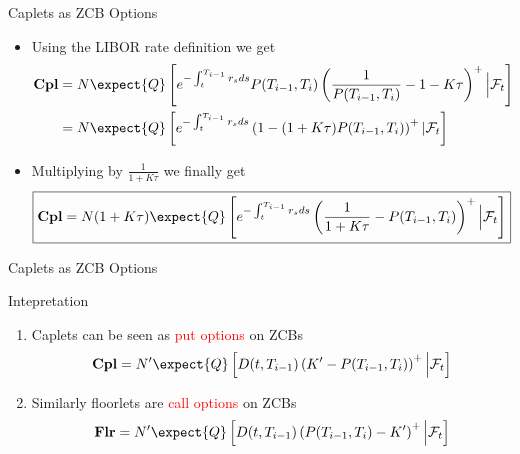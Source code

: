 \documentclass{beamer}
\begin{document}
\begin{frame}{Caplets as ZCB Options}
	\begin{itemize}
		\item<1-> Using the LIBOR rate definition we get
		\begin{equation*}
			\begin{aligned}
				\textbf{Cpl} &=N\expect{Q}\left[e^{-\int_t^{T_{i-1}}r_s ds}P(T_{i-1},T_i)\left(\frac{1}{P(T_{i-1},T_i)}-1-K\tau\right)^+ \Big\rvert \mathcal{F}_t\right] \\
				& = N\expect{Q}\left[e^{-\int_t^{T_{i-1}}r_s ds}\left(1-(1+K\tau)P(T_{i-1},T_i)\right)^+ | \mathcal{F}_t\right]
			\end{aligned}
		\end{equation*}
		\item<2-> Multiplying by $\frac{1}{1+K\tau}$ we finally get
		\begin{equation}
			\boxed{\textbf{Cpl}=N(1+K\tau)\expect{Q}\left[e^{-\int_t^{T_{i-1}}r_s ds}\left(\frac{1}{1+K\tau}-P(T_{i-1},T_i)\right)^+ \Big\rvert \mathcal{F}_t\right]}
		\end{equation}
	\end{itemize}
\end{frame}

\begin{frame}{Caplets as ZCB Options}
	\begin{block}{Intepretation}
		\begin{enumerate}
		\item Caplets can be seen as \textcolor{red}{put options} on ZCBs
\begin{equation*}
\textbf{Cpl}=N'\expect{Q}\left[D(t,T_{i-1})\left(K'-P(T_{i-1},T_i)\right)^+ \Big\rvert \mathcal{F}_t\right]
\end{equation*}
		\item Similarly floorlets are \textcolor{red}{call options} on ZCBs
\begin{equation}
\textbf{Flr}=N'\expect{Q}\left[D(t, T_{i-1})\left(P(T_{i-1},T_i)-K'\right)^+ \Big\rvert \mathcal{F}_t\right]
\end{equation}
		\end{enumerate}
	\end{block}
\end{frame}
\end{document}
